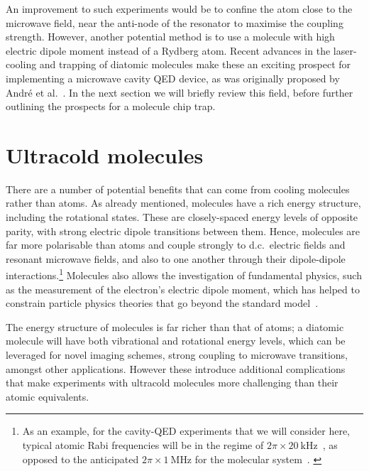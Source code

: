 An improvement to such experiments would be to confine the atom close to the
microwave field, near the anti-node of the resonator to maximise the coupling
strength. However, another potential method is to use a molecule with high
electric dipole moment instead of a Rydberg atom. Recent advances in the
laser-cooling and trapping of diatomic molecules make these an exciting
prospect for implementing a microwave cavity QED device, as was originally
proposed by Andr\'e et al.~\cite{Andre2006}. In the next section we will
briefly review this field, before further outlining the prospects for a
molecule chip trap.

\section{Ultracold molecules}

There are a number of potential benefits that can come from cooling molecules
rather than atoms. As already mentioned, molecules have a rich energy
structure, including the rotational states. These are closely-spaced energy
levels of opposite parity, with strong electric dipole transitions between
them. Hence, molecules are far more polarisable than atoms and couple strongly
to d.c.\ electric fields and resonant microwave fields, and also to one another
through their dipole-dipole interactions.\footnote{As an example, for the
cavity-QED experiments that we will consider here, typical atomic Rabi
frequencies will be in the regime of
$2\pi\times\SI{20}{\kilo\hertz}$~\cite{Hattermann2017}, as opposed to the
anticipated $2\pi\times\SI{1}{\mega\hertz}$ for the molecular
system~\cite{Andre2006}. \label{intro:fn:coupling}}
%
%
Molecules also allows the investigation of fundamental physics, such as the
measurement of the electron's electric dipole moment, which has helped to
constrain particle physics theories that go beyond the standard
model~\cite{ACMEreview}.

The energy structure of molecules is far richer than that of atoms; a diatomic
molecule will have both vibrational and rotational energy levels, which can be
leveraged for novel imaging schemes, strong coupling to microwave transitions,
amongst other applications. However these introduce additional complications
that make experiments with ultracold molecules more challenging than their
atomic equivalents.

